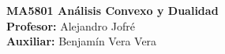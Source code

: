 \noindent \textbf{MA5801 Análisis Convexo y Dualidad}\\
\textbf{Profesor:} Alejandro Jofré\\
\textbf{Auxiliar:} Benjamín Vera Vera